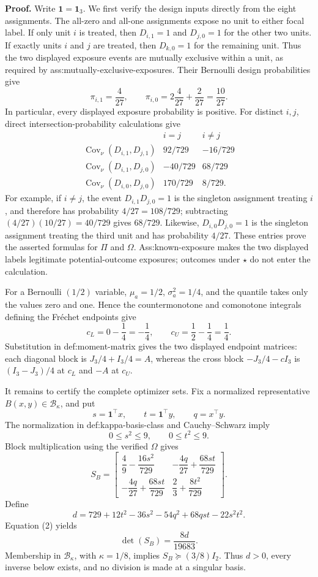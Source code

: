 \textbf{Proof.}
Write \(\mathbf 1=\mathbf 1_3\).  We first verify the design inputs directly from the eight assignments.  The all-zero and all-one assignments expose no unit to either focal label.  If only unit \(i\) is treated, then \(D_{i,1}=1\) and \(D_{j,0}=1\) for the other two units.  If exactly units \(i\) and \(j\) are treated, then \(D_{k,0}=1\) for the remaining unit.  Thus the two displayed exposure events are mutually exclusive within a unit, as required by ass:mutually-exclusive-exposures.  Their Bernoulli design probabilities give
\[
 \pi_{i,1}=\frac{4}{27},
 \qquad
 \pi_{i,0}=2\frac{4}{27}+\frac{2}{27}=\frac{10}{27}.
\]
In particular, every displayed exposure probability is positive.  For distinct \(i,j\), direct intersection-probability calculations give
\[
 \begin{array}{c|cc}
 &i=j&i\ne j\\ \hline
 \operatorname{Cov}_{\nu}(D_{i,1},D_{j,1})&92/729&-16/729\\
 \operatorname{Cov}_{\nu}(D_{i,1},D_{j,0})&-40/729&68/729\\
 \operatorname{Cov}_{\nu}(D_{i,0},D_{j,0})&170/729&8/729.
 \end{array}
\]
For example, if \(i\ne j\), the event \(D_{i,1}D_{j,0}=1\) is the singleton assignment treating \(i\), and therefore has probability \(4/27=108/729\); subtracting \((4/27)(10/27)=40/729\) gives \(68/729\).  Likewise, \(D_{i,0}D_{j,0}=1\) is the singleton assignment treating the third unit and has probability \(4/27\).  These entries prove the asserted formulas for \(\Pi\) and \(\Omega\).  Ass:known-exposure makes the two displayed labels legitimate potential-outcome exposures; outcomes under \(\star\) do not enter the calculation.

For a Bernoulli \((1/2)\) variable, \(\mu_a=1/2\), \(\sigma_a^2=1/4\), and the quantile takes only the values zero and one.  Hence the countermonotone and comonotone integrals defining the Fr\'echet endpoints give
\[
 c_L=0-\frac14=-\frac14,
 \qquad
 c_U=\frac12-\frac14=\frac14.
\]
Substitution in def:moment-matrix gives the two displayed endpoint matrices: each diagonal block is \(J_3/4+I_3/4=A\), whereas the cross block \(-J_3/4-cI_3\) is \((I_3-J_3)/4\) at \(c_L\) and \(-A\) at \(c_U\).

It remains to certify the complete optimizer sets.  Fix a normalized representative \(B(x,y)\in\mathcal B_\kappa\), and put
\[
 s=\mathbf 1^{\top}x,
 \qquad
 t=\mathbf 1^{\top}y,
 \qquad
 q=x^{\top}y.
\]
The normalization in def:kappa-basis-class and Cauchy--Schwarz imply
\[
 0\le s^2\le9,
 \qquad
 0\le t^2\le9.
 \tag{1}
\]
Block multiplication using the verified \(\Omega\) gives
\[
 S_B=
 \begin{bmatrix}
 \dfrac49-\dfrac{16s^2}{729}&-\dfrac{4q}{27}+\dfrac{68st}{729}\\[4pt]
 -\dfrac{4q}{27}+\dfrac{68st}{729}&\dfrac23+\dfrac{8t^2}{729}
 \end{bmatrix}.
 \tag{2}
\]
Define
\[
 d=729+12t^2-36s^2-54q^2+68qst-22s^2t^2.
 \tag{3}
\]
Equation (2) yields
\[
 \det(S_B)=\frac{8d}{19683}.
 \tag{4}
\]
Membership in \(\mathcal B_\kappa\), with \(\kappa=1/8\), implies \(S_B\succeq(3/8)I_2\).  Thus \(d>0\), every inverse below exists, and no division is made at a singular basis.

